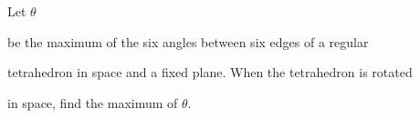 Let $\theta $

 be the maximum of the six angles between six edges of a regular 

tetrahedron in space and a fixed plane. When the tetrahedron is rotated 

in space, find the maximum of $\theta$.